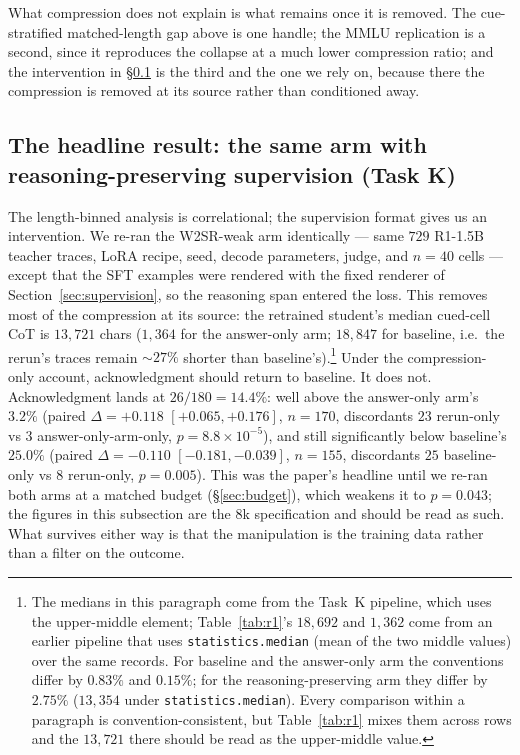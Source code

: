 \documentclass{article}
\begin{document}
What compression does not explain is what remains once it is removed. The
cue-stratified matched-length gap above is one handle; the MMLU replication is
a second, since it reproduces the collapse at a much lower compression ratio;
and the intervention in \S\ref{sec:taskK} is the third and the one we rely on,
because there the compression is removed at its source rather than conditioned
away.

\subsection{The headline result: the same arm with reasoning-preserving supervision (Task K)}
\label{sec:taskK}
The length-binned analysis is correlational; the supervision format gives us
an intervention. We re-ran the W2SR-weak arm identically --- same $729$
R1-1.5B teacher traces, LoRA recipe, seed, decode parameters, judge, and
$n = 40$ cells --- except that the SFT examples were rendered with the fixed
renderer of Section~\ref{sec:supervision}, so the reasoning span entered the
loss. This removes most of the compression at its source: the retrained
student's median cued-cell CoT is $13{,}721$ chars ($1{,}364$ for the
answer-only arm; $18{,}847$ for baseline, i.e.\ the rerun's traces remain
${\sim}27\%$ shorter than baseline's).\footnote{The medians in this paragraph
come from the Task~K pipeline, which uses the upper-middle element; Table~\ref{tab:r1}'s
$18{,}692$ and $1{,}362$ come from an earlier pipeline that uses
\texttt{statistics.median} (mean of the two middle values) over the same
records. For baseline and the answer-only arm the conventions differ by $0.83\%$
and $0.15\%$; for the reasoning-preserving arm they differ by $2.75\%$
($13{,}354$ under \texttt{statistics.median}). Every comparison within a
paragraph is convention-consistent, but Table~\ref{tab:r1} mixes them across
rows and the $13{,}721$ there should be read as the upper-middle value.} Under the compression-only account, acknowledgment
should return to baseline. It does not. Acknowledgment lands at
$26/180 = 14.4\%$: well above the answer-only arm's $3.2\%$ (paired
$\Delta = +0.118$ $[+0.065, +0.176]$, $n = 170$, discordants $23$ rerun-only
vs $3$ answer-only-arm-only, $p = 8.8 \times 10^{-5}$), and still
significantly below baseline's $25.0\%$ (paired $\Delta = -0.110$
$[-0.181, -0.039]$, $n = 155$, discordants $25$ baseline-only vs $8$
rerun-only, $p = 0.005$). This was the paper's headline until we re-ran both arms at a
matched budget (\S\ref{sec:budget}), which weakens it to $p = 0.043$; the
figures in this subsection are the 8k specification and should be read as such.
What survives either way is that the manipulation is the training data rather
than a filter on the outcome.
\end{document}
